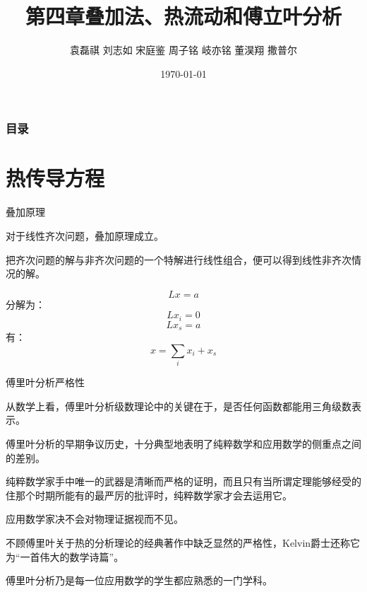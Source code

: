 \documentclass[10pt]{beamer}
\title{第四章\quad 叠加法、热流动和傅立叶分析}
\author{\footnotesize 袁磊祺 \quad 刘志如 \quad 宋庭鉴  \quad 周子铭 \quad 岐亦铭 \quad 董淏翔 \quad  撒普尔}
\date{\today}
\begin{document}
  
  \maketitle
  \begin{frame}
		\frametitle{目录}
		\tableofcontents{}
\end{frame}

  
\section{热传导方程}

\begin{frame}[allowframebreaks]{叠加原理}

对于线性齐次问题，叠加原理成立。

把齐次问题的解与非齐次问题的一个特解进行线性组合，便可以得到线性非齐次情况的解。

\[Lx=a\]
分解为：
	\[Lx_{i}=0 \] 
	\[Lx_{s}=a\]  
有：
\[x=\sum_{i}x_{i}+x_{s}\]

\end{frame}

\begin{frame}[allowframebreaks]{傅里叶分析严格性}

从数学上看，傅里叶分析级数理论中的关键在于，是否任何函数都能用三角级数表示。

傅里叶分析的早期争议历史，十分典型地表明了纯粹数学和应用数学的侧重点之间的差别。

纯粹数学家手中唯一的武器是清晰而严格的证明，而且只有当所谓定理能够经受的住那个时期所能有的最严厉的批评时，纯粹数学家才会去运用它。

应用数学家决不会对物理证据视而不见。

不顾傅里叶关于热的分析理论的经典著作中缺乏显然的严格性，Kelvin爵士还称它为“一首伟大的数学诗篇”。

傅里叶分析乃是每一位应用数学的学生都应熟悉的一门学科。


\end{frame}
\end{document}
